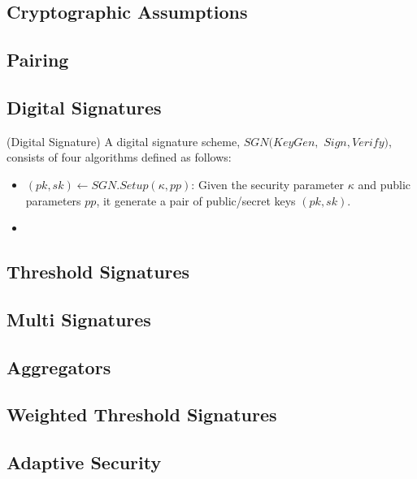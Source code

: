 \subsection{Cryptographic Assumptions}

\subsection{Pairing}

\subsection{Digital Signatures}
\begin{definition}{(Digital Signature)} A digital signature scheme, $SGN(KeyGen,$ $ Sign, Verify)$, consists of four algorithms defined as follows: 
\end{definition}
\begin{itemize}
    \item $(pk, sk)\leftarrow SGN.Setup(\kappa, pp)$: Given the security parameter $\kappa$ and public parameters $pp$, it generate a pair of public/secret keys $(pk, sk)$. 
    \item 
\end{itemize}

\subsection{Threshold Signatures}

\subsection{Multi Signatures}

\subsection{Aggregators}

\subsection{Weighted Threshold Signatures}

\subsection{Adaptive Security}